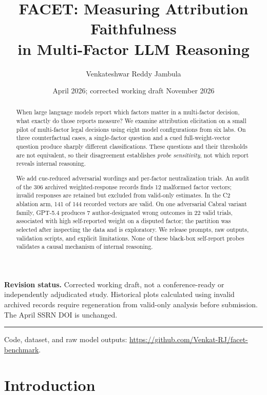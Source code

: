 \documentclass[11pt]{article}
\title{FACET: Measuring Attribution Faithfulness\\in Multi-Factor LLM Reasoning}
\author{Venkateshwar Reddy Jambula}
\affil{Pranaalpha Labs\\\texttt{venkateshwar.jambula@pranaalpha.com}}
\date{April 2026; corrected working draft November 2026}
\begin{document}
\maketitle

\begin{abstract}
\noindent
When large language models report which factors matter in a multi-factor decision, what exactly do those reports measure? We examine attribution elicitation on a small pilot of multi-factor legal decisions using eight model configurations from six labs. On three counterfactual cases, a single-factor question and a cued full-weight-vector question produce sharply different classifications. These questions and their thresholds are not equivalent, so their disagreement establishes \emph{probe sensitivity}, not which report reveals internal reasoning.

\smallskip
We add cue-reduced adversarial wordings and per-factor neutralization trials. An audit of the 306 archived weighted-response records finds 12 malformed factor vectors; invalid responses are retained but excluded from valid-only estimates. In the C2 ablation arm, 141 of 144 recorded vectors are valid. On one adversarial Cabral variant family, GPT-5.4 produces 7 author-designated wrong outcomes in 22 valid trials, associated with high self-reported weight on a disputed factor; the partition was selected after inspecting the data and is exploratory. We release prompts, raw outputs, validation scripts, and explicit limitations. None of these black-box self-report probes validates a causal mechanism of internal reasoning.
\end{abstract}

\smallskip
\noindent\textbf{Revision status.} Corrected working draft, not a conference-ready or independently adjudicated study. Historical plots calculated using invalid archived records require regeneration from valid-only analysis before submission. The April SSRN DOI is unchanged.

\noindent\rule{\linewidth}{0.4pt}
\vspace{-2pt}

\footnotesize
Code, dataset, and raw model outputs: \url{https://github.com/Venkat-RJ/facet-benchmark}.
\normalsize

\section{Introduction}
\end{document}
